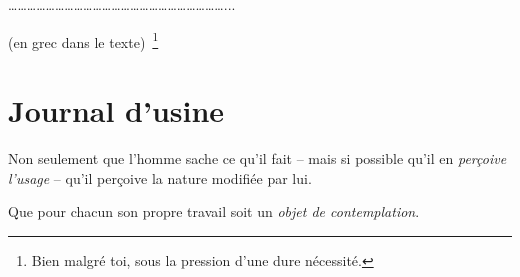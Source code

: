 \documentclass[french,twoside]{book} %
\newenvironment{quoteblock}%
  {\begin{quoting}}
  {\end{quoting}}
\newenvironment{quotebar}{%
    \def\FrameCommand{{\color{rubric!10!}\vrule width 0.5em} \hspace{0.9em}}%
    \def\OuterFrameSep{\itemsep} %
    \MakeFramed {\advance\hsize-\width \FrameRestore}
  }%
  {%
    \endMakeFramed
  }
\renewenvironment{quoteblock}%
  {%
    \savenotes
    \setstretch{0.9}
    \normalfont
    \begin{quotebar}
  }
  {%
    \end{quotebar}
    \spewnotes
  }
\begin{document}
\begin{center}
……………………………………………………………...\end{center}
\noindent (en grec dans le texte) \footnote{Bien malgré toi, sous la pression d'une dure nécessité.}
\section[Journal d'usine]{Journal d'usine}\renewcommand{\leftmark}{Journal d'usine}

\noindent \par

\begin{quoteblock}
 \noindent Non seulement que l'homme sache ce qu'il fait – mais si possible qu'il en {\itshape perçoive l'usage} – qu'il perçoive la nature modifiée par lui.\par
 Que pour chacun son propre travail soit un {\itshape objet de contemplation}.
 \end{quoteblock}
\end{document}
